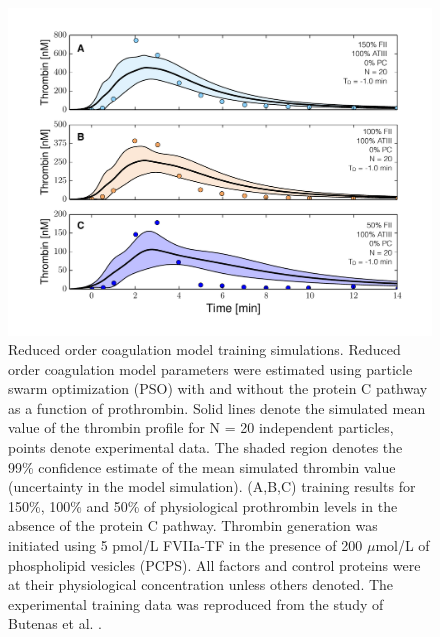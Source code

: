 \documentclass[12pt]{article}
\begin{document}
\begin{figure}
\centering
\includegraphics[width=1.0\textwidth]{./figs/Figure-3-DIFF_FII_NO_APC.pdf}
\caption{Reduced order coagulation model training simulations.
Reduced order coagulation model parameters were estimated using particle swarm optimization (PSO) with and without the protein C pathway as a function of prothrombin. 
Solid lines denote the simulated mean value of the thrombin profile for N = 20 independent particles, points denote experimental data. 
The shaded region denotes the 99\% confidence estimate of the mean simulated thrombin value (uncertainty in the model simulation).
(A,B,C) training results for 150\%, 100\% and 50\% of physiological prothrombin levels in the absence of the protein C pathway.
Thrombin generation was initiated using 5 pmol/L FVIIa-TF in the presence of 200 $\mu$mol/L of phospholipid vesicles (PCPS). 
All factors and control proteins were at their physiological concentration unless others denoted. 
The experimental training data was reproduced from the study of Butenas et al. \citep{Butenas:1999aa}.}\label{fig-diff_fII_NO_APC}
\end{figure}

\clearpage
\end{document}
